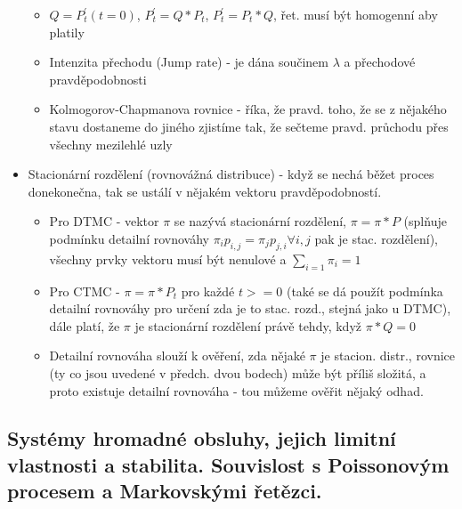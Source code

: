 \documentclass[a4paper,hidelinks]{article}
\begin{document}
\begin{itemize}
    \begin{itemize}
        \item $Q = P^\prime_t(t=0)$, $P^\prime_t = Q*P_t$, $P^\prime_t = P_t*Q$, řet. musí být homogenní aby platily
        \item Intenzita přechodu (Jump rate) - je dána součinem $\lambda$ a přechodové pravděpodobnosti
        \item Kolmogorov-Chapmanova rovnice - říka, že pravd. toho, že se z nějakého stavu dostaneme do jiného zjistíme tak, že sečteme pravd. průchodu přes všechny mezilehlé uzly
    \end{itemize}
    \item Stacionární rozdělení (rovnovážná distribuce) - když se nechá běžet proces donekonečna, tak se ustálí v nějakém vektoru pravděpodobností.
    \begin{itemize}
        \item Pro DTMC - vektor $\pi$ se nazývá stacionární rozdělení, $\pi=\pi*P$ (splňuje podmínku detailní rovnováhy $\pi_ip_{i,j}=\pi_jp_{j,i}  \forall i,j$ pak je stac. rozdělení), všechny prvky vektoru musí být nenulové a $\sum_{i=1}\pi_i=1$
        \item Pro CTMC - $\pi=\pi*P_t$ pro každé $t>=0$ (také se dá použít podmínka detailní rovnováhy pro určení zda je to stac. rozd., stejná jako u DTMC), dále platí, že $\pi$ je stacionární rozdělení právě tehdy, když $\pi*Q=0$
        \item Detailní rovnováha slouží k ověření, zda nějaké $\pi$ je stacion. distr., rovnice (ty co jsou uvedené v předch. dvou bodech) může být příliš složitá, a proto existuje detailní rovnováha - tou můžeme ověřit nějaký odhad.
    \end{itemize}
\end{itemize}


\subsection{Systémy hromadné obsluhy, jejich limitní vlastnosti a stabilita. Souvislost s Poissonovým procesem a Markovskými řetězci.}
\end{document}
